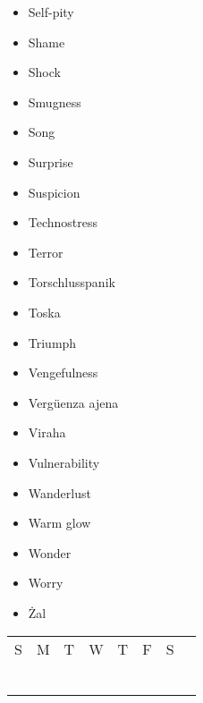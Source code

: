 \documentclass[a5paper]{article}
\begin{document}
\begin{itemize}
  \item Self-pity
	\item Shame
	\item Shock
	\item Smugness
	\item Song
	\item Surprise
	\item Suspicion
	\item Technostress
	\item Terror
	\item Torschlusspanik
	\item Toska
	\item Triumph
	\item Vengefulness
	\item Vergüenza ajena
	\item Viraha
	\item Vulnerability
	\item Wanderlust
 	\item Warm glow
	\item Wonder
	\item Worry
	\item Żal
\end{itemize}
\begin{table}[htp]
\begin{tabular}{|l|l|l|l|l|l|l|l}
\cline{1-7}
S & M & T & W & T & F & S & \multirow{7}{*}{} \\ \cline{1-7}
  &   &   &   &   &   &   &                   \\ \cline{1-7}
  &   &   &   &   &   &   &                   \\ \cline{1-7}
  &   &   &   &   &   &   &                   \\ \cline{1-7}
  &   &   &   &   &   &   &                   \\ \cline{1-7}
  &   &   &   &   &   &   &                   \\ \cline{1-7}
  &   &   &   &   &   &   &                   \\ \cline{1-7}
\end{tabular}
\end{table}
\end{document}
